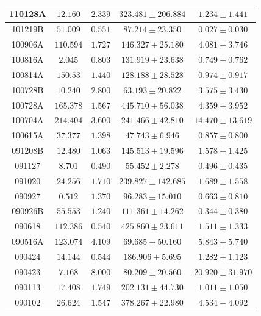 \begin{longtable}{|c|c|c|c|c|}
\hline
110128A & $   12.160 $ & $ 2.339 $ & $ 323.481 \pm 206.884 $ & $  1.234 \pm  1.441 $ \\
\hline
101219B & $  51.009 $ & $ 0.551 $ & $  87.214 \pm  23.350 $ & $  0.027 \pm  0.030 $ \\
\hline
100906A & $ 110.594 $ & $ 1.727 $ & $ 146.327 \pm  25.180 $ & $  4.081 \pm  3.746 $ \\
\hline
100816A & $   2.045 $ & $ 0.803 $ & $ 131.919 \pm  23.638 $ & $  0.749 \pm  0.762 $ \\
\hline
100814A & $  150.53 $ & $ 1.440 $ & $ 128.188 \pm  28.528 $ & $  0.974 \pm  0.917 $ \\
\hline
100728B & $   10.240 $ & $ 2.800 $ & $  63.193 \pm  20.822 $ & $  3.575 \pm  3.430 $ \\
\hline
100728A & $ 165.378 $ & $ 1.567 $ & $ 445.710 \pm  56.038 $ & $  4.359 \pm  3.952 $ \\
\hline
100704A & $ 214.404 $ & $ 3.600 $ & $ 241.466 \pm  42.810 $ & $ 14.470 \pm 13.619 $ \\
\hline
100615A & $  37.377 $ & $ 1.398 $ & $  47.743 \pm   6.946 $ & $  0.857 \pm  0.800 $ \\
\hline
091208B & $   12.480 $ & $ 1.063 $ & $ 145.513 \pm  19.596 $ & $  1.578 \pm  1.425 $ \\
\hline
091127 & $   8.701 $ & $ 0.490 $ & $  55.452 \pm   2.278 $ & $  0.496 \pm  0.435 $ \\
\hline
091020 & $  24.256 $ & $ 1.710 $ & $ 239.827 \pm 142.685 $ & $  1.689 \pm  1.558 $ \\
\hline
090927 & $   0.512 $ & $ 1.370 $ & $  96.283 \pm  15.010 $ & $  0.663 \pm  0.810 $ \\
\hline
090926B & $  55.553 $ & $ 1.240 $ & $ 111.361 \pm  14.262 $ & $  0.344 \pm  0.380 $ \\
\hline
090618 & $ 112.386 $ & $ 0.540 $ & $ 425.860 \pm  23.611 $ & $  1.511 \pm  1.333 $ \\
\hline
090516A & $ 123.074 $ & $ 4.109 $ & $  69.685 \pm  50.160 $ & $  5.843 \pm  5.740 $ \\
\hline
090424 & $  14.144 $ & $ 0.544 $ & $ 186.906 \pm   5.695 $ & $  1.282 \pm  1.123 $ \\
\hline
090423 & $   7.168 $ & $ 8.000 $ & $  80.209 \pm  20.560 $ & $ 20.920 \pm 31.970 $ \\
\hline
090113 & $  17.408 $ & $ 1.749 $ & $ 202.131 \pm  44.730 $ & $  1.011 \pm  1.050 $ \\
\hline
090102 & $  26.624 $ & $ 1.547 $ & $ 378.267 \pm  22.980 $ & $  4.534 \pm  4.092 $ \\

\end{longtable}
